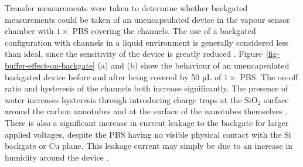 \documentclass[
  a4paper,
]{scrbook}
\begin{document}
Transfer measurements were taken to determine whether backgated
measurements could be taken of an unencapsulated device in the vapour
sensor chamber with \(1 \times\) PBS covering the channels. The use of a
backgated configuration with channels in a liquid environment is
generally considered less than ideal, since the sensitivity of the
device is greatly reduced \autocite{Li2023}.
Figure~\ref{fig-buffer-effect-on-backgate} (a) and (b) show the
behaviour of an unencapsulated backgated device before and after being
covered by 50 µL of \(1 \times\) PBS. The on-off ratio and hysteresis of
the channels both increase significantly. The presence of water
increases hysteresis through introducing charge traps at the SiO\(_2\)
surface around the carbon nanotubes and at the surface of the nanotubes
themselves \autocite{Kim2003,Lee2007,Franklin2012,Ha2014}. There is also
a significant increase in current leakage to the backgate for larger
applied voltages, despite the PBS having no visible physical contact
with the Si backgate or Cu plane. This leakage current may simply be due
to an increase in humidity around the device \autocite{Conseil2014}.
\end{document}
